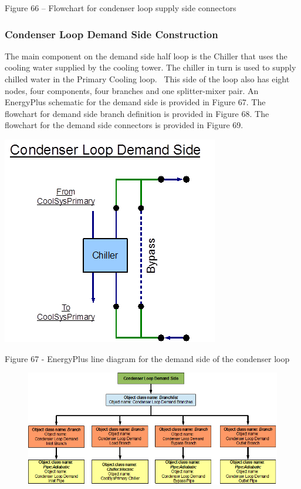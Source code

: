 Figure 66 -- Flowchart for condenser loop supply side connectors

\subsubsection{Condenser Loop Demand Side Construction}\label{condenser-loop-demand-side-construction}

The main component on the demand side half loop is the Chiller that uses the cooling water supplied by the cooling tower. The chiller in turn is used to supply chilled water in the Primary Cooling loop. ~This side of the loop also has eight nodes, four components, four branches and one splitter-mixer pair. An EnergyPlus schematic for the demand side is provided in Figure 67. The flowchart for demand side branch definition is provided in Figure 68. The flowchart for the demand side connectors is provided in Figure 69.

\textbf{\includegraphics{media/image067.png}}

Figure 67 - EnergyPlus line diagram for the demand side of the condenser loop

\begin{figure}[htbp]
\centering
\includegraphics{media/image068.png}
\caption{}
\end{figure}

